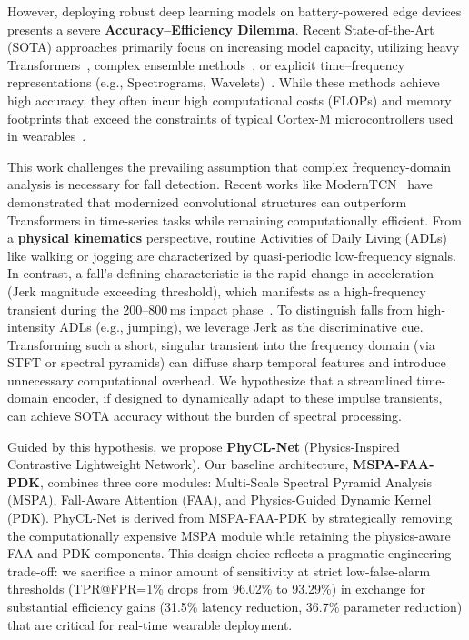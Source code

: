\documentclass{article}
\begin{document}
However, deploying robust deep learning models on battery-powered edge devices presents a severe \textbf{Accuracy--Efficiency Dilemma}. Recent State-of-the-Art (SOTA) approaches primarily focus on increasing model capacity, utilizing heavy Transformers~\cite{Zerveas2021TST}, complex ensemble methods~\cite{Hussain2023Enhanced}, or explicit time--frequency representations (e.g., Spectrograms, Wavelets)~\cite{wang2019deep,mubashir2013survey}. While these methods achieve high accuracy, they often incur high computational costs (FLOPs) and memory footprints that exceed the constraints of typical Cortex-M microcontrollers used in wearables~\cite{Banbury2021TinyML}.

This work challenges the prevailing assumption that complex frequency-domain analysis is necessary for fall detection. Recent works like ModernTCN~\cite{luo2024moderntcn} have demonstrated that modernized convolutional structures can outperform Transformers in time-series tasks while remaining computationally efficient. From a \textbf{physical kinematics} perspective, routine Activities of Daily Living (ADLs) like walking or jogging are characterized by quasi-periodic low-frequency signals. In contrast, a fall's defining characteristic is the rapid change in acceleration (Jerk magnitude exceeding threshold), which manifests as a high-frequency transient during the 200--800\,ms impact phase~\cite{Bourke2007Threshold,Kangas2008Comparison}. To distinguish falls from high-intensity ADLs (e.g., jumping), we leverage Jerk as the discriminative cue. Transforming such a short, singular transient into the frequency domain (via STFT or spectral pyramids) can diffuse sharp temporal features and introduce unnecessary computational overhead. We hypothesize that a streamlined time-domain encoder, if designed to dynamically adapt to these impulse transients, can achieve SOTA accuracy without the burden of spectral processing.

Guided by this hypothesis, we propose \textbf{PhyCL-Net} (Physics-Inspired Contrastive Lightweight Network). Our baseline architecture, \textbf{MSPA-FAA-PDK}, combines three core modules: Multi-Scale Spectral Pyramid Analysis (MSPA), Fall-Aware Attention (FAA), and Physics-Guided Dynamic Kernel (PDK). PhyCL-Net is derived from MSPA-FAA-PDK by strategically removing the computationally expensive MSPA module while retaining the physics-aware FAA and PDK components. This design choice reflects a pragmatic engineering trade-off: we sacrifice a minor amount of sensitivity at strict low-false-alarm thresholds (TPR@FPR=1\% drops from 96.02\% to 93.29\%) in exchange for substantial efficiency gains (31.5\% latency reduction, 36.7\% parameter reduction) that are critical for real-time wearable deployment.
\end{document}
